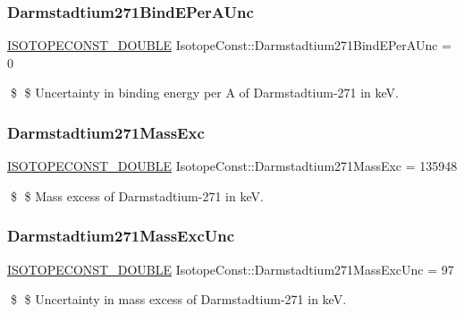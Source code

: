 \subsubsection{\texorpdfstring{Darmstadtium271\+Bind\+E\+Per\+A\+Unc}{Darmstadtium271BindEPerAUnc}}
{\footnotesize\ttfamily \mbox{\hyperlink{group___isotope_const-_macros_ga8f45a7272ce02c0b4c65c44636ed719a}{I\+S\+O\+T\+O\+P\+E\+C\+O\+N\+S\+T\+\_\+\+D\+O\+U\+B\+LE}} Isotope\+Const\+::\+Darmstadtium271\+Bind\+E\+Per\+A\+Unc = 0}

\$ \$ Uncertainty in binding energy per A of Darmstadtium-\/271 in keV. \mbox{\label{group___isotope_const-_darmstadtium-_ds271_gab8350b28f11bdec6c7fce8f61d871fab}} 
\subsubsection{\texorpdfstring{Darmstadtium271\+Mass\+Exc}{Darmstadtium271MassExc}}
{\footnotesize\ttfamily \mbox{\hyperlink{group___isotope_const-_macros_ga8f45a7272ce02c0b4c65c44636ed719a}{I\+S\+O\+T\+O\+P\+E\+C\+O\+N\+S\+T\+\_\+\+D\+O\+U\+B\+LE}} Isotope\+Const\+::\+Darmstadtium271\+Mass\+Exc = 135948}

\$ \$ Mass excess of Darmstadtium-\/271 in keV. \mbox{\label{group___isotope_const-_darmstadtium-_ds271_ga68a8db572bf080118132d55c1865d398}} 
\subsubsection{\texorpdfstring{Darmstadtium271\+Mass\+Exc\+Unc}{Darmstadtium271MassExcUnc}}
{\footnotesize\ttfamily \mbox{\hyperlink{group___isotope_const-_macros_ga8f45a7272ce02c0b4c65c44636ed719a}{I\+S\+O\+T\+O\+P\+E\+C\+O\+N\+S\+T\+\_\+\+D\+O\+U\+B\+LE}} Isotope\+Const\+::\+Darmstadtium271\+Mass\+Exc\+Unc = 97}

\$ \$ Uncertainty in mass excess of Darmstadtium-\/271 in keV. \mbox{\label{group___isotope_const-_darmstadtium-_ds271_ga3657228717ac6d3685b8dc66f4a0fc56}} 
